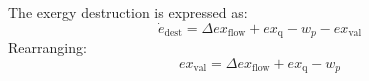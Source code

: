 The exergy destruction is expressed as:  
\[
\dot{e}_{\text{dest}} = \Delta ex_{\text{flow}} + ex_{\text{q}} - w_p - ex_{\text{val}}
\]  
Rearranging:  
\[
ex_{\text{val}} = \Delta ex_{\text{flow}} + ex_{\text{q}} - w_p
\]